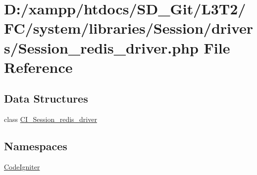 \hypertarget{system_2libraries_2_session_2drivers_2_session__redis__driver_8php}{}\section{D\+:/xampp/htdocs/\+S\+D\+\_\+\+Git/\+L3\+T2/\+F\+C/system/libraries/\+Session/drivers/\+Session\+\_\+redis\+\_\+driver.php File Reference}
\label{system_2libraries_2_session_2drivers_2_session__redis__driver_8php}
\subsection*{Data Structures}
\begin{DoxyCompactItemize}
\item 
class \hyperlink{class_c_i___session__redis__driver}{C\+I\+\_\+\+Session\+\_\+redis\+\_\+driver}
\end{DoxyCompactItemize}
\subsection*{Namespaces}
\begin{DoxyCompactItemize}
\item 
 \hyperlink{namespace_code_igniter}{Code\+Igniter}
\end{DoxyCompactItemize}
